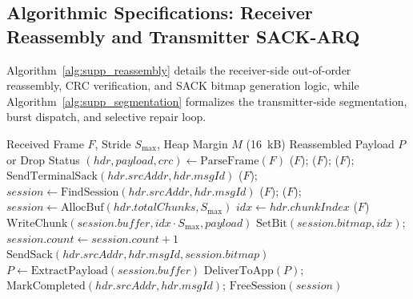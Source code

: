 \documentclass[journal]{IEEEtran}
\begin{document}
\subsection{Algorithmic Specifications: Receiver Reassembly and Transmitter SACK-ARQ}
Algorithm~\ref{alg:supp_reassembly} details the receiver-side out-of-order reassembly, CRC verification, and SACK bitmap generation logic, while Algorithm~\ref{alg:supp_segmentation} formalizes the transmitter-side segmentation, burst dispatch, and selective repair loop.

\begin{algorithm}[htpb]
\caption{Out-of-Order Reassembly and SACK Generation (Receiver)}
\label{alg:supp_reassembly}
\footnotesize
\begin{algorithmic}[1]
\Require Received Frame $F$, Stride $S_{\max}$, Heap Margin $M$ (16~kB)
\Ensure Reassembled Payload $P$ or Drop Status
\State $(hdr, payload, crc) \gets \text{ParseFrame}(F)$
 \State {}($F$); \Return \EndIf
{} \State {}($F$); \Return \EndIf
{} \State {}($F$); \Return \EndIf
{}
     \State $\text{SendTerminalSack}(hdr.srcAddr, hdr.msgId)$ \EndIf
    \State {}($F$); \Return
\EndIf
\State $session \gets \text{FindSession}(hdr.srcAddr, hdr.msgId)$
 \State {}($F$); \Return \EndIf
{}
        \State {}($F$); \Return {}
    \EndIf
    \State $session \gets \text{AllocBuf}(hdr.totalChunks, S_{\max})$
\EndIf
\State $idx \gets hdr.chunkIndex$
 \State {}($F$) 
\Else
    \State $\text{WriteChunk}(session.buffer, idx \cdot S_{\max}, payload)$
    \State $\text{SetBit}(session.bitmap, idx)$; $session.count \gets session.count + 1$
\EndIf
{} \State $\text{SendSack}(hdr.srcAddr, hdr.msgId, session.bitmap)$ \EndIf
{}
    \State $P \gets \text{ExtractPayload}(session.buffer)$
    \State $\text{DeliverToApp}(P)$; $\text{MarkCompleted}(hdr.srcAddr, hdr.msgId)$; $\text{FreeSession}(session)$
\EndIf
\end{algorithmic}
\end{algorithm}
\end{document}
